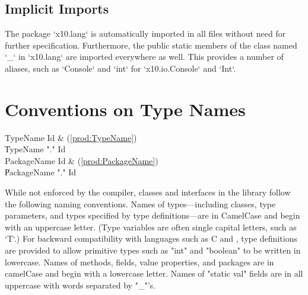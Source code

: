 \subsection{Implicit Imports}

The package \xcd`x10.lang` is automatically imported in all
files without need for further specification.
Furthermore, the public static members of the class named \xcd`_` in
\xcd`x10.lang` are imported everywhere as well. This provides a number of
aliases, such as \xcd`Console` and \xcd`int` for \xcd`x10.io.Console` and
\xcd`Int`. 




\section{Conventions on Type Names}

\begin{bbgrammar}
            TypeName \: Id & (\ref{prod:TypeName}) \\
                     \| TypeName \xcd"." Id \\
         PackageName \: Id & (\ref{prod:PackageName}) \\
                     \| PackageName \xcd"." Id \\
\end{bbgrammar}


While not enforced by the compiler, classes and interfaces
in the \Xten{} library follow the following naming conventions.
Names of types---including classes,
type parameters, and types specified by type definitions---are in
CamelCase and begin with an uppercase letter.  (Type variables are often
single capital letters, such as \xcd`T`.)
For backward
compatibility with languages such as C and \java{}, type
definitions are provided to allow primitive types
such as \xcd"int" and \xcd"boolean" to be written in lowercase.
Names of methods, fields, value properties, and packages are in camelCase and
begin with a lowercase letter. 
Names of \xcd"static val" fields are in all uppercase with words
separated by \xcd"_"'s.
